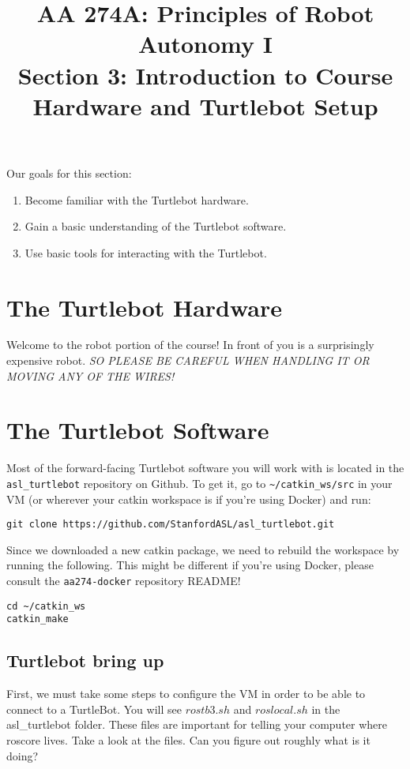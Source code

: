 \documentclass{article}
\title{AA 274A: Principles of Robot Autonomy I \\ Section 3: Introduction to Course Hardware and Turtlebot Setup}
\date{}
\begin{document}
\maketitle
\pagestyle{fancy}

Our goals for this section: \begin{enumerate}
	\item Become familiar with the Turtlebot hardware.
	\item Gain a basic understanding of the Turtlebot software.
	\item Use basic tools for interacting with the Turtlebot.
\end{enumerate}

\section{The Turtlebot Hardware}

Welcome to the robot portion of the course! In front of you is a surprisingly expensive robot. \textit{SO PLEASE BE CAREFUL WHEN HANDLING IT OR MOVING ANY OF THE WIRES!}

\section{The Turtlebot Software}

Most of the forward-facing Turtlebot software you will work with is located in the \texttt{asl\_turtlebot} repository on Github. To get it, go to \texttt{\textasciitilde/catkin\_ws/src} in your VM (or wherever your catkin workspace is if you're using Docker) and run:

\begin{lstlisting}
git clone https://github.com/StanfordASL/asl_turtlebot.git
\end{lstlisting}

Since we downloaded a new catkin package, we need to rebuild the workspace by running the following. This might be different if you're using Docker, please consult the \texttt{aa274-docker} repository README!

\begin{lstlisting}
cd ~/catkin_ws
catkin_make
\end{lstlisting}

\subsection{Turtlebot bring up}
First, we must take some steps to configure the VM in order to be able to connect to a TurtleBot. You
will see $rostb3.sh$ and $roslocal.sh$ in the asl\_turtlebot folder. These files are important for telling your computer where roscore lives. Take a look at the files. Can you figure out roughly what is it doing?
\end{document}
